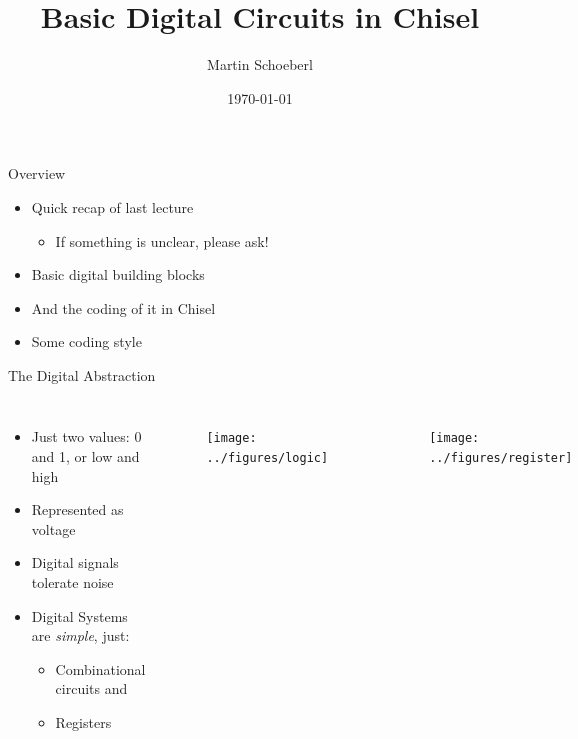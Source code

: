 

\newif\ifbook



\title{Basic Digital Circuits in Chisel}
\author{Martin Schoeberl}
\date{\today}



\begin{frame}
\titlepage
\end{frame}


\begin{frame}[fragile]{Overview}
\begin{itemize}
\item Quick recap of last lecture
\begin{itemize}
\item If something is unclear, please ask!
\end{itemize}
\item Basic digital building blocks
\item And the coding of it in Chisel
\item Some coding style
\end{itemize}
\end{frame}

\begin{frame}[fragile]{The Digital Abstraction}
\begin{columns}
 
\begin{itemize}
\item Just two values: 0 and 1, or low and high
\item Represented as voltage
\item Digital signals tolerate noise
\item Digital Systems are \emph{simple}, just:
\begin{itemize}
\item Combinational circuits and
\item Registers
\end{itemize}
\end{itemize}
 
\begin{figure}
  \texttt{[image: ../figures/logic]}
\end{figure}
\begin{figure}
  \texttt{[image: ../figures/register]}
\end{figure}
\end{columns}

\end{frame}

